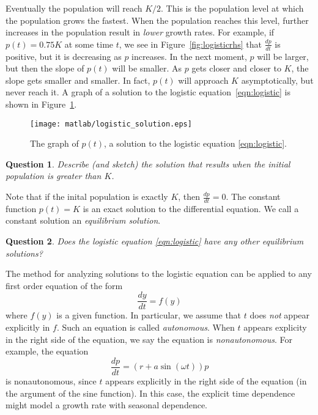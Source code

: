 \documentclass{book}
\newtheorem{question}{Question}
\begin{document}
Eventually the population will reach $K/2$.  This is the population
level at which the population grows the fastest.
When the population reaches this level, further increases in the
population result in \emph{lower} growth rates.
For example, if $p(t) = 0.75K$ at some time $t$, we see in
Figure~\ref{fig:logisticrhs} that $\frac{dp}{dt}$ is positive, but it is
decreasing as $p$ increases.  In the next moment, $p$ will be larger,
but then the slope of $p(t)$ will be smaller.
As $p$ gets closer and closer to $K$, the slope gets smaller and smaller.
In fact, $p(t)$ will approach $K$ asymptotically, but never reach it.
A graph of a solution to the logistic equation~\eqref{eqn:logistic} is
shown in Figure~\ref{fig:logisticsol}.
\begin{figure}
\centerline{\texttt{[image: matlab/logistic\_solution.eps]}} 
\caption{The graph of $p(t)$, a solution to the logistic
equation \eqref{eqn:logistic}.}
\label{fig:logisticsol}
\end{figure}

\begin{question}
Describe (and sketch) the solution that
results when the initial population is greater than $K$.
\end{question}

Note that if the inital population is exactly $K$, then
$\frac{dp}{dt} = 0$.  The constant function $p(t)=K$ is an
exact solution to the differential equation.
We call a constant solution an
\emph{equilibrium solution}.

\begin{question}
Does the logistic equation \eqref{eqn:logistic} have any other
equilibrium solutions?
\end{question}

The method for analyzing solutions to the logistic equation can be
applied to any first order equation of the form
\begin{equation}
   \frac{dy}{dt} = f(y)
\end{equation}
where $f(y)$ is a given function.
In particular, we assume that $t$ does \emph{not} appear explicitly
in $f$.  Such an equation is called \emph{autonomous}.
When $t$ appears explicity in the right side of the equation,
we say the equation is \emph{nonautonomous}.
For example, the equation
\begin{equation}
  \frac{dp}{dt} = (r+a \sin(\omega t))p
\end{equation}
is nonautonomous, since $t$ appears explicitly in the right side of the
equation (in the argument of the sine function).
In this case, the explicit time dependence might model a growth
rate with seasonal dependence.
\end{document}
